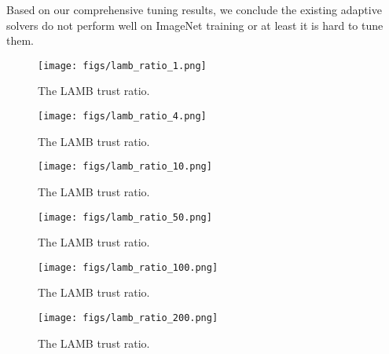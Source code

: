 \documentclass{article} \usepackage{iclr2020_conference,times}
\begin{document}
Based on our comprehensive tuning results, we conclude the existing adaptive solvers do not perform well on ImageNet training or at least it is hard to tune them.



\begin{figure*}[tb]
\vspace{5pt}
\centering
\texttt{[image: figs/lamb\_ratio\_1.png]}
\caption{The LAMB trust ratio.}
\label{fig:lamb_ratio_1}
\vspace{-10pt}
\end{figure*}

\begin{figure*}[tb]
\vspace{5pt}
\centering
\texttt{[image: figs/lamb\_ratio\_4.png]}
\caption{The LAMB trust ratio.}
\label{fig:lamb_ratio_4}
\vspace{-10pt}
\end{figure*}

\begin{figure*}[tb]
\vspace{5pt}
\centering
\texttt{[image: figs/lamb\_ratio\_10.png]}
\caption{The LAMB trust ratio.}
\label{fig:lamb_ratio_10}
\vspace{-10pt}
\end{figure*}

\begin{figure*}[tb]
\vspace{5pt}
\centering
\texttt{[image: figs/lamb\_ratio\_50.png]}
\caption{The LAMB trust ratio.}
\label{fig:lamb_ratio_50}
\vspace{-10pt}
\end{figure*}

\begin{figure*}[tb]
\vspace{5pt}
\centering
\texttt{[image: figs/lamb\_ratio\_100.png]}
\caption{The LAMB trust ratio.}
\label{fig:lamb_ratio_100}
\vspace{-10pt}
\end{figure*}

\begin{figure*}[tb]
\vspace{5pt}
\centering
\texttt{[image: figs/lamb\_ratio\_200.png]}
\caption{The LAMB trust ratio.}
\label{fig:lamb_ratio_200}
\vspace{-10pt}
\end{figure*}
\end{document}
